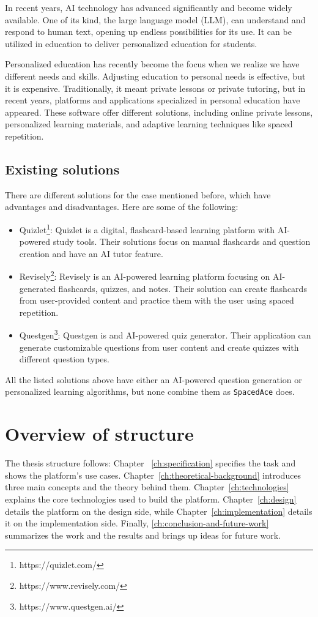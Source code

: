 In recent years, AI technology has advanced significantly and become widely available. One of its kind, the large language model (LLM), can understand and respond to human text, opening up endless possibilities for its use. It can be utilized in education to deliver personalized education for students.

Personalized education has recently become the focus when we realize we have different needs and skills. Adjusting education to personal needs is effective, but it is expensive. Traditionally, it meant private lessons or private tutoring, but in recent years, platforms and applications specialized in personal education have appeared. These software offer different solutions, including online private lessons, personalized learning materials, and adaptive learning techniques like spaced repetition.

\subsection{Existing solutions}

There are different solutions for the case mentioned before, which have advantages and disadvantages. Here are some of the following:

\begin{itemize}
    \item{Quizlet\footnote{https://quizlet.com/}}: Quizlet is a digital, flashcard-based learning platform with AI-powered study tools. Their solutions focus on manual flashcards and question creation and have an AI tutor feature.
    \item{Revisely\footnote{https://www.revisely.com/}}: Revisely is an AI-powered learning platform focusing on AI-generated flashcards, quizzes, and notes. Their solution can create flashcards from user-provided content and practice them with the user using spaced repetition.
    \item{Questgen\footnote{https://www.questgen.ai/}}: Questgen is and AI-powered quiz generator. Their application can generate customizable questions from user content and create quizzes with different question types.
\end{itemize}

All the listed solutions above have either an AI-powered question generation or personalized learning algorithms, but none combine them as \texttt{SpacedAce} does.

\section{Overview of structure}

The thesis structure follows: Chapter ~\ref{ch:specification} specifies the task and shows the platform's use cases. Chapter~\ref{ch:theoretical-background} introduces three main concepts and the theory behind them. Chapter~\ref{ch:technologies} explains the core technologies used to build the platform. Chapter~\ref{ch:design} details the platform on the design side, while Chapter~\ref{ch:implementation} details it on the implementation side. Finally, \ref{ch:conclusion-and-future-work} summarizes the work and the results and brings up ideas for future work.
